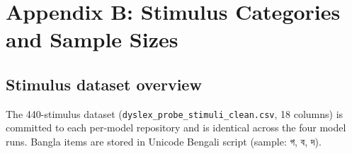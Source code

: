 \chapter*{Appendix B: Stimulus Categories and Sample Sizes}

\section*{Stimulus dataset overview}

The 440-stimulus dataset (\texttt{dyslex\_probe\_stimuli\_clean.csv}, 18 columns) is committed to each per-model repository and is identical across the four model runs. Bangla items are stored in Unicode Bengali script (sample: {\banglafont গ}, {\banglafont ব}, {\banglafont দ}).

\begin{table}[H]
\centering
\caption{Per-category stimulus counts (English / Bangla). Total 440 items.}
\label{tab:stim-distribution}
\small
{}
\end{table}


